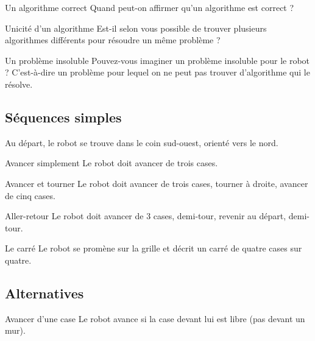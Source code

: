		\begin{Exercice}{Un algorithme correct}
			Quand peut-on affirmer qu'un algorithme est correct ?
		\end{Exercice}

		\begin{Exercice}{Unicité d'un algorithme}
			Est-il selon vous possible de trouver 
			plusieurs algorithmes différents
			pour résoudre un même problème ?
		\end{Exercice}

		\begin{Exercice}{Un problème insoluble}
			Pouvez-vous imaginer un problème insoluble pour le robot ?
			C'est-à-dire un problème pour lequel on ne peut pas
			trouver d'algorithme qui le résolve.
		\end{Exercice}

	\subsection{Séquences simples}

		Au départ, le robot se trouve dans le coin sud-ouest, 
		orienté vers le nord.

		\begin{Exercice}{Avancer simplement}
			Le robot doit avancer de trois cases.
		\end{Exercice}

		\begin{Exercice}{Avancer et tourner}
			Le robot doit avancer de trois cases, tourner à droite, 
			avancer de cinq cases.
		\end{Exercice}

		\begin{Exercice}{Aller-retour}
			Le robot doit avancer de 3 cases, demi-tour, 
			revenir au départ, demi-tour.
		\end{Exercice}

		\begin{Exercice}{Le carré}
			Le robot se promène sur la grille 
			et décrit un carré de quatre cases sur quatre.
		\end{Exercice}
		
	\subsection{Alternatives}

		\begin{Exercice}{Avancer d'une case}
			Le robot avance si la case devant lui est libre (pas devant un mur).
		\end{Exercice}

